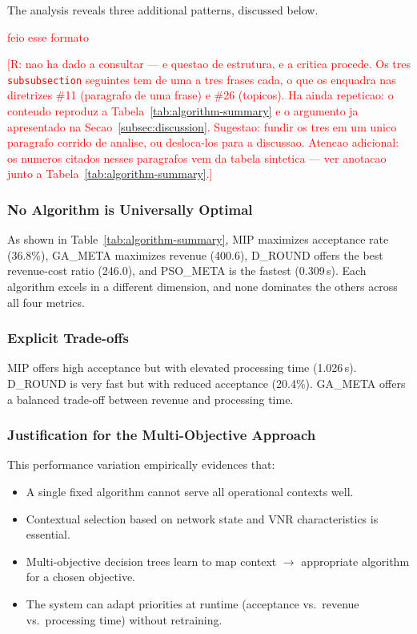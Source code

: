\documentclass[runningheads]{llncs}
\begin{document}
The analysis reveals three additional patterns, discussed below.

\textcolor{red}{feio esse formato}

\textcolor{red}{[R: nao ha dado a consultar --- e questao de estrutura, e a critica procede. Os tres \texttt{subsubsection} seguintes tem de uma a tres frases cada, o que os enquadra nas diretrizes \#11 (paragrafo de uma frase) e \#26 (topicos). Ha ainda repeticao: o conteudo reproduz a Tabela~\ref{tab:algorithm-summary} e o argumento ja apresentado na Secao~\ref{subsec:discussion}. Sugestao: fundir os tres em um unico paragrafo corrido de analise, ou desloca-los para a discussao. Atencao adicional: os numeros citados nesses paragrafos vem da tabela sintetica --- ver anotacao junto a Tabela~\ref{tab:algorithm-summary}.]}

\subsubsection{No Algorithm is Universally Optimal}
As shown in Table~\ref{tab:algorithm-summary}, MIP maximizes acceptance rate (36.8\%), GA\_META maximizes revenue (400.6), D\_ROUND offers the best revenue-cost ratio (246.0), and PSO\_META is the fastest (0.309\,s). Each algorithm excels in a different dimension, and none dominates the others across all four metrics.

\subsubsection{Explicit Trade-offs}
MIP offers high acceptance but with elevated processing time (1.026\,s). D\_ROUND is very fast but with reduced acceptance (20.4\%). GA\_META offers a balanced trade-off between revenue and processing time.

\subsubsection{Justification for the Multi-Objective Approach}
This performance variation empirically evidences that:
\begin{itemize}
    \item A single fixed algorithm cannot serve all operational contexts well.
    \item Contextual selection based on network state and VNR characteristics is essential.
    \item Multi-objective decision trees learn to map context $\rightarrow$ appropriate algorithm for a chosen objective.
    \item The system can adapt priorities at runtime (acceptance vs.\ revenue vs.\ processing time) without retraining.
\end{itemize}
\end{document}
